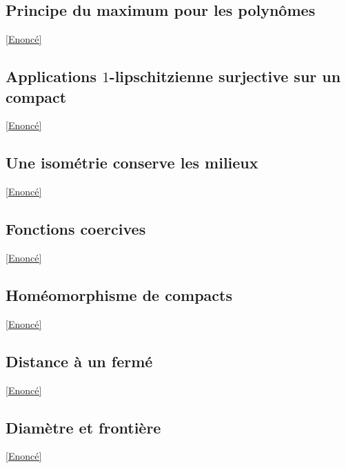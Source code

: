 \documentclass{book}
\begin{document}
	\subsection{Principe du maximum pour les polynômes }
	\label{sec:principe-du-maximum-pour-les-polynomes}
	\textcolor{blue}{\hyperref[Principe du maximum pour les polynômes]{[Enoncé]}}\\
	
	\subsection{Applications $1$-lipschitzienne surjective sur un compact }
	\label{sec:applications-1-lipschitzienne-surjective-sur-un-compact}
	\textcolor{blue}{\hyperref[Applications 1-lipschitzienne sujective sur un compact]{[Enoncé]}}\\
	
	\subsection{Une isométrie conserve les milieux }
	\label{sec:une-isometrie-conserve-les-milieux}
	\textcolor{blue}{\hyperref[Une isométrie conserve les milieux]{[Enoncé]}}\\
	
	\subsection{Fonctions coercives }
	\label{sec:fonctions-coercives}
	\textcolor{blue}{\hyperref[Fonctions coercives]{[Enoncé]}}\\
	
	\subsection{Homéomorphisme de compacts }
	\label{sec:homeomorphisme-de-compacts}
	\textcolor{blue}{\hyperref[Homéomorphisme de compacts]{[Enoncé]}}\\
	
	\subsection{Distance à un fermé}
	\label{sec:distance-a-un-ferme}
	\textcolor{blue}{\hyperref[Distance à un fermé]{[Enoncé]}}\\
	
	\subsection{Diamètre et frontière}
	\label{sec:diametre-et-frontiere}
	\textcolor{blue}{\hyperref[Diamètre et frontière]{[Enoncé]}}\\
	
\end{document}
